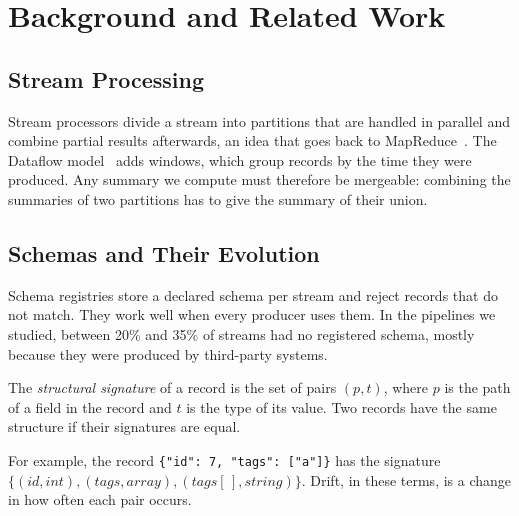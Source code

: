 \section{Background and Related Work}\label{sec:background}
\subsection{Stream Processing}
Stream processors divide a stream into partitions that are handled in parallel and combine partial results afterwards, an idea that goes back to MapReduce~\cite{dean2008mapreduce}. The Dataflow model~\cite{akidau2015dataflow} adds windows, which group records by the time they were produced. Any summary we compute must therefore be mergeable: combining the summaries of two partitions has to give the summary of their union.

\subsection{Schemas and Their Evolution}
Schema registries store a declared schema per stream and reject records that do not match. They work well when every producer uses them. In the pipelines we studied, between 20\% and 35\% of streams had no registered schema, mostly because they were produced by third-party systems.

\begin{definition}\label{def:signature}
The \emph{structural signature} of a record is the set of pairs $(p, t)$, where $p$ is the path of a field in the record and $t$ is the type of its value. Two records have the same structure if their signatures are equal.
\end{definition}

For example, the record \texttt{\{"id": 7, "tags": ["a"]\}} has the signature $\{(\mathit{id}, \mathit{int}), (\mathit{tags}, \mathit{array}), (\mathit{tags}[\,], \mathit{string})\}$. Drift, in these terms, is a change in how often each pair occurs.
